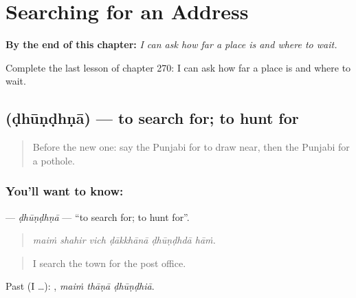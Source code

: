
\chapter{Searching for an Address}
\label{ch:pa-a2-searching-for-an-address}

\begin{chapteropening}
\textbf{By the end of this chapter:} \emph{I can ask how far a place is and where to wait.}

Complete the last lesson of chapter 270: I can ask how far a place is and where to wait.
\end{chapteropening}

\section[\texorpdfstring{\pa{ਢੂੰਢਣਾ} (ḍhūṇḍhṇā)}{ਢੂੰਢਣਾ (ḍhūṇḍhṇā)}]{ (ḍhūṇḍhṇā) — to search for; to hunt for}

\label{lesson:PA-C270-dhundhna}



\begin{quote}
Before the new one: say the Punjabi for to draw near, then the Punjabi for a pothole.
\end{quote}

\subsection*{You'll want to know: }
\textbf{} — \emph{ḍhūṇḍhṇā} — \textquotedblleft{}to search for; to hunt for\textquotedblright{}.

\begin{quote}
     
\end{quote}

\begin{quote}
\emph{maiṁ shahir vich ḍākkhānā ḍhūṇḍhdā hāṁ.}
\end{quote}

\begin{quote}
I search the town for the post office.
\end{quote}

Past (I …):   , \emph{maiṁ thāṇā ḍhūṇḍhiā}.

